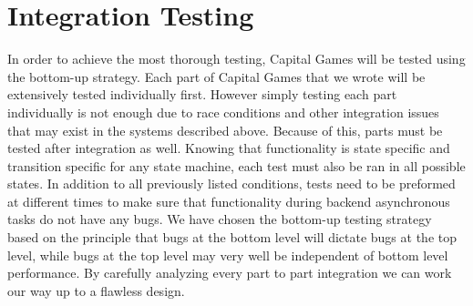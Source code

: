 \section{Integration Testing}

In order to achieve the most thorough testing, Capital Games will be 
tested using the bottom-up strategy. Each part of Capital Games that 
we wrote will be extensively tested individually first. However 
simply testing each part individually is not enough due to race 
conditions and other integration issues that may exist in the 
systems described above. Because of this, parts must be tested after 
integration as well.  Knowing that functionality is state specific 
and transition specific for any state machine, each test must also be 
ran in all possible states. In addition to all previously listed 
conditions, tests need to be preformed at different times to make sure 
that functionality during backend asynchronous tasks do not have any 
bugs. We have chosen the bottom-up testing strategy based on the 
principle that bugs at the bottom level will dictate bugs at the 
top level, while bugs at the top level may very well be independent 
of bottom level performance. By carefully analyzing every part to part 
integration we can work our way up to a flawless design.

